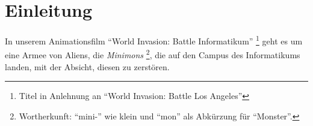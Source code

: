 \section{Einleitung}

In unserem Animationsfilm ``World Invasion: Battle Informatikum'' \footnote{Titel in Anlehnung an ``World Invasion: Battle Los Angeles''} geht es um eine Armee von Aliens, die \textit{Minimons} \footnote{Wortherkunft: ``mini-'' wie klein und ``mon'' als Abkürzung für ``Monster''.}, die auf den Campus des Informatikums landen, mit der Absicht, diesen zu zerstören.
